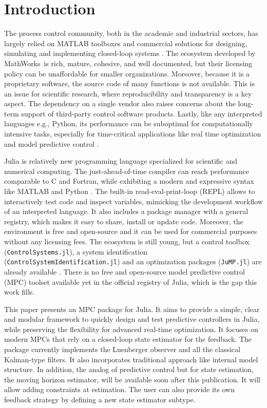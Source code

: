 \section{Introduction}

The process control community, both in the academic and industrial sectors, has largely relied on MATLAB toolboxes and commercial solutions for designing, simulating and implementing closed-loop systems \citep{optimMatlab}. The ecosystem developed by MathWorks\texttrademark\ is rich, mature, cohesive, and well documented, but their licensing policy can be unaffordable for smaller organizations. Moreover, because it is a proprietary software, the source code of many functions is not available. This is an issue for scientific research, where reproducibility and transparency is a key aspect. The dependency on a single vendor also raises concerns about the long-term support of third-party control software products. Lastly, like any interpreted languages e.g., Python, its performance can be suboptimal for computationally intensive tasks, especially for time-critical applications like real time optimization and model predictive control \citep{matlabPythonJulia, juliaML}.

Julia is relatively new programming language specialized for scientific and numerical computing. The just-ahead-of-time compiler can reach performance comparable to C and Fortran, while exhibiting a modern and expressive syntax like MATLAB and Python \citep{juliaPaper}. The built-in read-eval-print-loop (REPL) allows to interactively test code and inspect variables, mimicking the development workflow of an interpreted language. It also includes a package manager with a general registry, which makes it easy to share, install or update code. Moreover, the environment is free and open-source and it can be used for commercial purposes without any licensing fees. The ecosystem is still young, but a control toolbox (\texttt{ControlSystems.jl}), a system identification (\texttt{ControlSystemIdentification.jl}) and an optimization packages (\texttt{JuMP.jl}) are already available \citep{controlsystems, jump}. There is no free and open-source model predictive control (MPC) toolset available yet in the official registry of Julia, which is the gap this work fills.

This paper presents an MPC package for Julia. It aims to provide a simple, clear and modular framework to quickly design and test predictive controllers in Julia, while preserving the flexibility for advanced real-time optimization. It focuses on modern MPCs that rely on a closed-loop state estimator for the feedback. The package currently implements the Luenberger observer and all the classical Kalman-type filters. It also incorporates traditional approach like internal model structure. In addition, the analog of predictive control but for state estimation, the moving horizon estimator, will be available soon after this publication. It will allow adding constraints at estimation. The user can also provide its own feedback strategy by defining a new state estimator subtype.

